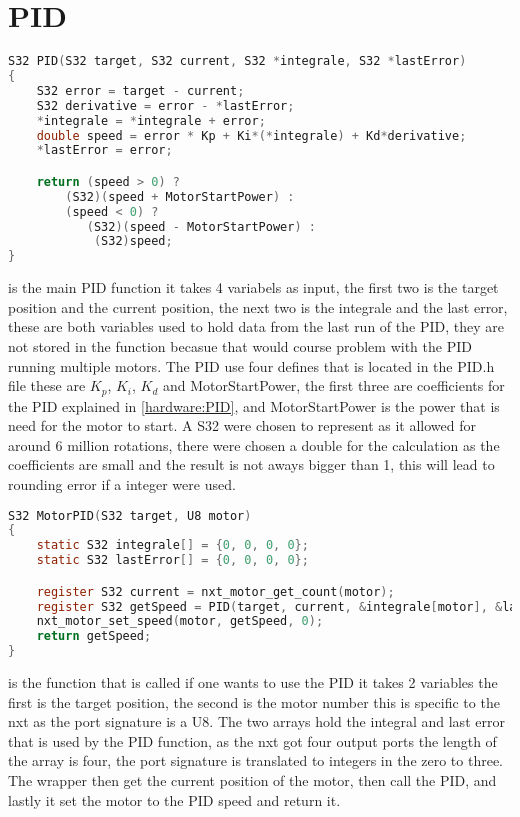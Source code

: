 \section{PID}

\begin{lstlisting}[language=C, label={PID}, caption={PID code}]
S32 PID(S32 target, S32 current, S32 *integrale, S32 *lastError)
{
	S32 error = target - current;
	S32 derivative = error - *lastError;
	*integrale = *integrale + error;
	double speed = error * Kp + Ki*(*integrale) + Kd*derivative;
	*lastError = error;

	return (speed > 0) ?
        (S32)(speed + MotorStartPower) :
        (speed < 0) ?
           (S32)(speed - MotorStartPower) :
            (S32)speed;
}
\end{lstlisting}
 is the main PID function it takes 4 variabels as input, the first two is the target position and the current position, the next two is the integrale and the last error, these are both variables used to hold data from the last run of the PID, they are not stored in the function becasue that would course problem with the PID running multiple motors. The PID use four defines that is located in the PID.h file these are $K_p$, $K_i$, $K_d$ and MotorStartPower, the first three are coefficients for the PID explained in \cref{hardware:PID}, and MotorStartPower is the power that is need for the motor to start. A S32 were chosen to represent as it allowed for around 6 million rotations, there were chosen a double for the calculation as the coefficients are small and the result is not aways bigger than 1, this will lead to rounding error if a integer were used.


\begin{lstlisting}[language=C, label={PIDwrapper}, caption={PID wrapper}]
S32 MotorPID(S32 target, U8 motor)
{
    static S32 integrale[] = {0, 0, 0, 0};
    static S32 lastError[] = {0, 0, 0, 0};

	register S32 current = nxt_motor_get_count(motor);
	register S32 getSpeed = PID(target, current, &integrale[motor], &lastError[motor]);
	nxt_motor_set_speed(motor, getSpeed, 0);
	return getSpeed;
}
\end{lstlisting}

 is the function that is called if one wants to use the PID it takes 2 variables the first is the target position, the second is the motor number this is specific to the nxt as the port signature is a U8. The two arrays hold the integral and last error that is used by the PID function, as the nxt got four output ports the length of the array is four, the port signature is translated to integers in the zero to three. The wrapper then get the current position of the motor, then call the PID, and lastly it set the motor to the PID speed and return it.

